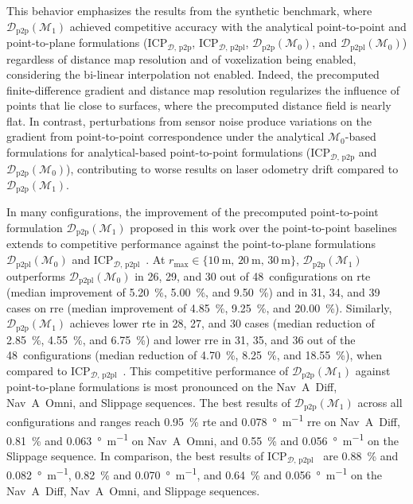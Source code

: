 This behavior emphasizes the results from the synthetic benchmark, where
$\mathcal{D}_\mathrm{p2p}(\mathcal{M}_1)$ achieved competitive accuracy with
the analytical point-to-point and point-to-plane formulations
($\mathrm{ICP}_{\mathcal{D},\,\mathrm{p2p}}$,
$\mathrm{ICP}_{\mathcal{D},\,\mathrm{p2pl}}$,
$\mathcal{D}_\mathrm{p2p}(\mathcal{M}_0)$, and
$\mathcal{D}_\mathrm{p2pl}(\mathcal{M}_0)$) regardless of distance map
resolution and of voxelization being enabled,
considering the bi-linear interpolation not enabled. Indeed,
the precomputed finite-difference gradient and distance map resolution
regularizes the influence of points that lie close to surfaces, where the
precomputed distance field is nearly flat.
In contrast, perturbations from sensor noise produce variations on
the gradient from point-to-point correspondence under the analytical
$\mathcal{M}_0$-based formulations for analytical-based point-to-point
formulations ($\mathrm{ICP}_{\mathcal{D},\,\mathrm{p2p}}$ and
$\mathcal{D}_\mathrm{p2p}(\mathcal{M}_0)$), contributing to worse results on
laser odometry drift compared to $\mathcal{D}_\mathrm{p2p}(\mathcal{M}_1)$.

In many configurations, the improvement of the precomputed point-to-point
formulation $\mathcal{D}_\mathrm{p2p}(\mathcal{M}_1)$ proposed in this work over
the point-to-point baselines extends to competitive performance against
the point-to-plane formulations $\mathcal{D}_\mathrm{p2pl}(\mathcal{M}_0)$
and $\mathrm{ICP}_{\mathcal{D},\,\mathrm{p2pl}}$~\cite{chen-medioni:icra:1991}.
At $r_\mathrm{max} \in \{\SI{10}{\metre},\,\SI{20}{\metre},\,\SI{30}{\metre}\}$,
$\mathcal{D}_\mathrm{p2p}(\mathcal{M}_1)$ outperforms
$\mathcal{D}_\mathrm{p2pl}(\mathcal{M}_0)$ in 26, 29, and 30 out of
48~configurations on \gls{rte} (median improvement of \SI{5.20}{\percent},
\SI{5.00}{\percent}, and \SI{9.50}{\percent}) and in 31, 34, and 39 cases on
\gls{rre} (median improvement of \SI{4.85}{\percent}, \SI{9.25}{\percent}, and
\SI{20.00}{\percent}). Similarly, $\mathcal{D}_\mathrm{p2p}(\mathcal{M}_1)$
achieves lower \gls{rte} in 28, 27, and 30 cases (median reduction of
\SI{2.85}{\percent}, \SI{4.55}{\percent}, and \SI{6.75}{\percent}) and lower
\gls{rre} in 31, 35, and 36 out of the 48~configurations (median reduction of
\SI{4.70}{\percent}, \SI{8.25}{\percent}, and \SI{18.55}{\percent}), when
compared to $\mathrm{ICP}_{\mathcal{D},\,\mathrm{p2pl}}$~\cite{chen-medioni:icra:1991}.
This competitive performance of $\mathcal{D}_\mathrm{p2p}(\mathcal{M}_1)$
against point-to-plane formulations is most pronounced on the Nav~A~Diff,
Nav~A~Omni, and Slippage sequences. The best results of
$\mathcal{D}_\mathrm{p2p}(\mathcal{M}_1)$ across all configurations
and ranges reach \SI{0.95}{\percent} \gls{rte} and
\SI{0.078}{\degree\per\metre} \gls{rre} on Nav~A~Diff,
\SI{0.81}{\percent} and \SI{0.063}{\degree\per\metre} on Nav~A~Omni, and
\SI{0.55}{\percent} and \SI{0.056}{\degree\per\metre} on the Slippage sequence.
In comparison, the best results of
$\mathrm{ICP}_{\mathcal{D},\,\mathrm{p2pl}}$~\cite{chen-medioni:icra:1991} are
\SI{0.88}{\percent} and \SI{0.082}{\degree\per\metre},
\SI{0.82}{\percent} and \SI{0.070}{\degree\per\metre}, and
\SI{0.64}{\percent} and \SI{0.056}{\degree\per\metre} on the Nav~A~Diff,
Nav~A~Omni, and Slippage sequences.

